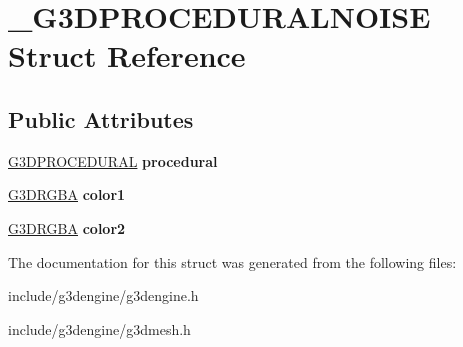 \hypertarget{struct__G3DPROCEDURALNOISE}{}\section{\+\_\+\+G3\+D\+P\+R\+O\+C\+E\+D\+U\+R\+A\+L\+N\+O\+I\+SE Struct Reference}
\label{struct__G3DPROCEDURALNOISE}
\subsection*{Public Attributes}
\begin{DoxyCompactItemize}
\item 
\mbox{\label{struct__G3DPROCEDURALNOISE_a7692ba580b485c8080595f6b40a849a8}} 
\hyperlink{struct__G3DPROCEDURAL}{G3\+D\+P\+R\+O\+C\+E\+D\+U\+R\+AL} {\bfseries procedural}
\item 
\mbox{\label{struct__G3DPROCEDURALNOISE_a4bd9cdb11cb9ba79815f75cb0b2b98de}} 
\hyperlink{struct__G3DRGBA}{G3\+D\+R\+G\+BA} {\bfseries color1}
\item 
\mbox{\label{struct__G3DPROCEDURALNOISE_a9ada7d7ad5e2354b415ed52ef9d32788}} 
\hyperlink{struct__G3DRGBA}{G3\+D\+R\+G\+BA} {\bfseries color2}
\end{DoxyCompactItemize}


The documentation for this struct was generated from the following files\+:\begin{DoxyCompactItemize}
\item 
include/g3dengine/g3dengine.\+h\item 
include/g3dengine/g3dmesh.\+h\end{DoxyCompactItemize}

